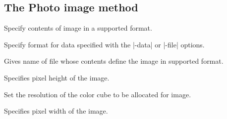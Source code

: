 \subsection*{The Photo image method}
\vspace{-4pt}

\begin{enum}{1cm}

Specify contents of image in a supported format.

Specify format for data specified with the |-data| or |-file| options.

Gives name of file whose contents define the image in supported format.

Specifies pixel height of the image.

Set the resolution of the color cube to be allocated for image.

Specifies pixel width of the image.

\end{enum}

